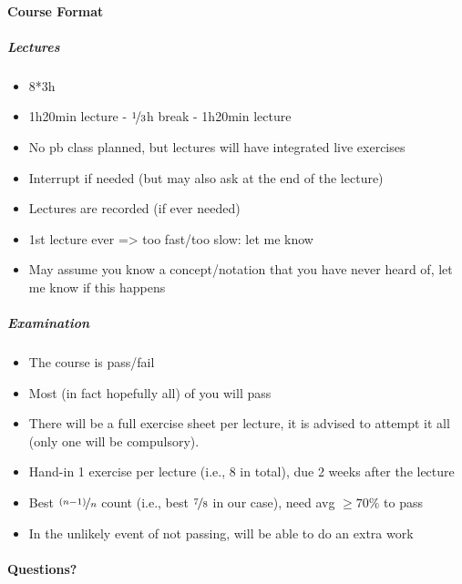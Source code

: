 \documentclass[11pt,a4paper]{report}
\begin{document}
	\paragraph{Course Format}
	\subparagraph{Lectures}
	\begin{itemize}
		\item 8*3h
		\item 1h20min lecture - $\nicefrac{1}{3}$h break - 1h20min lecture
		\item No pb class planned, but lectures will have integrated live exercises
		\item Interrupt if needed (but may also ask at the end of the lecture)
		\item Lectures are recorded (if ever needed)
		\item 1st lecture ever => too fast/too slow: let me know
		\item May assume you know a concept/notation that you have never heard of, let me know if this happens
	\end{itemize}
	\subparagraph{Examination}
	\begin{itemize}
		\item The course is pass/fail
		\item Most (in fact hopefully all) of you will pass
		\item There will be a full exercise sheet per lecture, it is advised to attempt it all (only one will be compulsory).
		\item Hand-in 1 exercise per lecture (i.e., 8 in total), due 2 weeks after the lecture
		\item Best $\nicefrac{(n-1)}{n}$ count (i.e., best $\nicefrac{7}{8}$ in our case), need avg $\geq 70 \%$ to pass
		\item In the unlikely event of not passing, will be able to do an extra work
	\end{itemize}
	\paragraph{Questions?}
	
	\newpage
	
	
	
	
	
	
	
	
	
	
	
	

	
	
	
\end{document}
